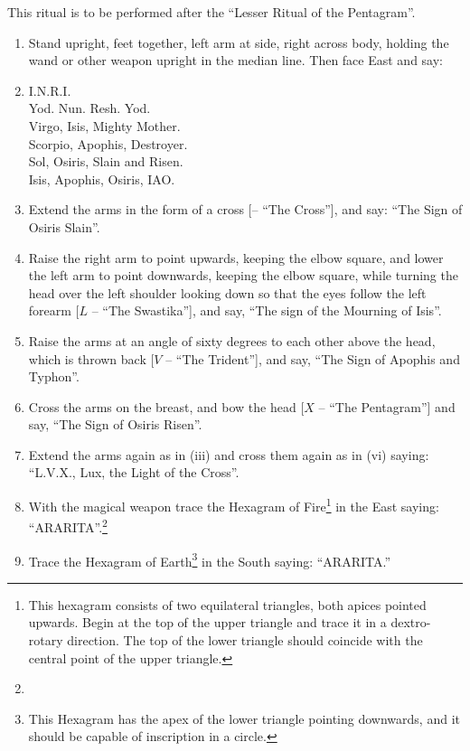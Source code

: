 This ritual is to be performed after the \enquote{Lesser Ritual of the Pentagram}.

\begin{enumerate}[label=(\textit{\Roman*})]
\item Stand upright, feet together, left arm at side, right across body, holding the wand or other weapon upright in the median line. Then face East and say:
\item I.N.R.I. \\
Yod. Nun. Resh. Yod. \\
Virgo, Isis, Mighty Mother. \\
Scorpio, Apophis, Destroyer. \\
Sol, Osiris, Slain and Risen. \\
Isis, Apophis, Osiris, IAO.
\item Extend the arms in the form of a cross [\Cross -- \enquote{The Cross}], and say: \enquote{The Sign of Osiris Slain}.
\item Raise the right arm to point upwards, keeping the elbow square, and lower the left arm to point downwards, keeping the elbow square, while turning the head over the left shoulder looking down so that the eyes follow the left forearm [$L$ -- \enquote{The Swastika}], and say, \enquote{The sign of the Mourning of Isis}.
\item Raise the arms at an angle of sixty degrees to each other above the head, which is thrown back [$V$ -- \enquote{The Trident}], and say, \enquote{The Sign of Apophis and Typhon}.
\item Cross the arms on the breast, and bow the head [$X$ -- \enquote{The Pentagram}] and say, \enquote{The Sign of Osiris Risen}.
\item Extend the arms again as in (iii) and cross them again as in (vi) saying: \enquote{L.V.X., Lux, the Light of the Cross}.
\item With the magical weapon trace the Hexagram of Fire\footnote{This hexagram consists of two equilateral triangles, both apices pointed upwards. Begin at the top of the upper triangle and trace it in a dextro-rotary direction. The top of the lower triangle should coincide with the central point of the upper triangle.} in the East saying: \enquote{ARARITA}.\footnote{\footnotemark}
\item Trace the Hexagram of Earth\footnote{This Hexagram has the apex of the lower triangle pointing downwards, and it should be capable of inscription in a circle.} in the South saying: \enquote{ARARITA.}

\end{enumerate}
